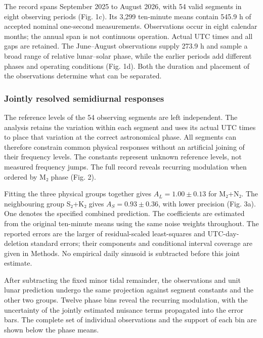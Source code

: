 \documentclass[
  10pt,
  a4paper,
]{article}
\begin{document}
The record spans September 2025 to August 2026, with 54 valid segments
in eight observing periods (Fig. 1c). Its 3,299 ten-minute means contain
545.9 h of accepted nominal one-second measurements. Observations occur
in eight calendar months; the annual span is not continuous operation.
Actual UTC times and all gaps are retained. The June--August
observations supply 273.9 h and sample a broad range of relative
lunar--solar phase, while the earlier periods add different phases and
operating conditions (Fig. 1d). Both the duration and placement of the
observations determine what can be separated.

\hypertarget{jointly-resolved-semidiurnal-responses}{%
\subsubsection{Jointly resolved semidiurnal
responses}\label{jointly-resolved-semidiurnal-responses}}

The reference levels of the 54 observing segments are left independent.
The analysis retains the variation within each segment and uses its
actual UTC times to place that variation at the correct astronomical
phase. All segments can therefore constrain common physical responses
without an artificial joining of their frequency levels. The constants
represent unknown reference levels, not measured frequency jumps. The
full record reveals recurring modulation when ordered by M₂ phase (Fig.
2).

Fitting the three physical groups together gives \(A_L=1.00\pm0.13\) for
M₂+N₂. The neighbouring group S₂+K₂ gives \(A_S=0.93\pm0.36\), with
lower precision (Fig. 3a). One denotes the specified combined
prediction. The coefficients are estimated from the original ten-minute
means using the same noise weights throughout. The reported errors are
the larger of residual-scaled least-squares and UTC-day-deletion
standard errors; their components and conditional interval coverage are
given in Methods. No empirical daily sinusoid is subtracted before this
joint estimate.

After subtracting the fixed minor tidal remainder, the observations and
unit lunar prediction undergo the same projection against segment
constants and the other two groups. Twelve phase bins reveal the
recurring modulation, with the uncertainty of the jointly estimated
nuisance terms propagated into the error bars. The complete set of
individual observations and the support of each bin are shown below the
phase means.
\end{document}
